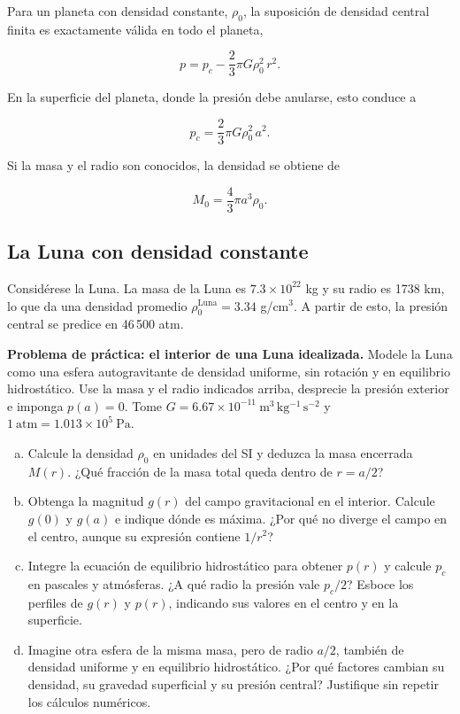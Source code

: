 Para un planeta con densidad constante, $\rho_0$, la suposición de densidad central finita es exactamente válida en todo el planeta,

$$ p = p_c - \frac{2}{3}\pi G \rho_0^2\, r^2. $$

En la superficie del planeta, donde la presión debe anularse, esto conduce a

$$ p_c = \frac{2}{3}\pi G \rho_0^2\, a^2. $$

Si la masa y el radio son conocidos, la densidad se obtiene de

$$ M_0 = \frac{4}{3}\pi a^3 \rho_0. $$

\subsection{La Luna con densidad constante}

Considérese la Luna. La masa de la Luna es $7.3 \times 10^{22}$ kg y su radio es 1738 km, lo que da una densidad promedio $\rho_0^{\mathrm{Luna}} = 3.34$ g/cm$^3$. A partir de esto, la presión central se predice en 46\,500 atm.

\textbf{Problema de práctica: el interior de una Luna idealizada.} Modele la Luna como una esfera autogravitante de densidad uniforme, sin rotación y en equilibrio hidrostático. Use la masa y el radio indicados arriba, desprecie la presión exterior e imponga $p(a)=0$. Tome $G=6.67\times10^{-11}\ \mathrm{m^3\,kg^{-1}\,s^{-2}}$ y $1\ \mathrm{atm}=1.013\times10^5\ \mathrm{Pa}$.

\begin{enumerate}[(a)]
\item Calcule la densidad $\rho_0$ en unidades del SI y deduzca la masa encerrada $M(r)$. ¿Qué fracción de la masa total queda dentro de $r=a/2$?
\item Obtenga la magnitud $g(r)$ del campo gravitacional en el interior. Calcule $g(0)$ y $g(a)$ e indique dónde es máxima. ¿Por qué no diverge el campo en el centro, aunque su expresión contiene $1/r^2$?
\item Integre la ecuación de equilibrio hidrostático para obtener $p(r)$ y calcule $p_c$ en pascales y atmósferas. ¿A qué radio la presión vale $p_c/2$? Esboce los perfiles de $g(r)$ y $p(r)$, indicando sus valores en el centro y en la superficie.
\item Imagine otra esfera de la misma masa, pero de radio $a/2$, también de densidad uniforme y en equilibrio hidrostático. ¿Por qué factores cambian su densidad, su gravedad superficial y su presión central? Justifique sin repetir los cálculos numéricos.
\end{enumerate}


